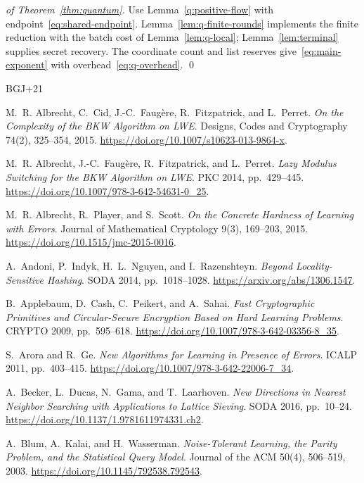 \documentclass[runningheads,envcountsame,envcountsect,orivec]{llncs}
\begin{document}
\begin{proof}[of Theorem~\ref{thm:quantum}]
Use Lemma~\ref{q:positive-flow} with endpoint~\eqref{eq:shared-endpoint}.
Lemma~\ref{lem:q-finite-rounds} implements the finite reduction with
the batch cost of Lemma~\ref{lem:q-local};
Lemma~\ref{lem:terminal} supplies secret recovery.
The coordinate count and list reserves give~\eqref{eq:main-exponent}
with overhead~\eqref{eq:q-overhead}.
\qed
\end{proof}


\label{page:main-end}
\FloatBarrier

\begin{thebibliography}{BGJ+21}
\label{sec:references}

M.~R. Albrecht, C.~Cid, J.-C.~Faug\`ere, R.~Fitzpatrick, and L.~Perret.
\emph{On the Complexity of the BKW Algorithm on LWE}.
Designs, Codes and Cryptography 74(2), 325--354, 2015.
\url{https://doi.org/10.1007/s10623-013-9864-x}.

M.~R. Albrecht, J.-C.~Faug\`ere, R.~Fitzpatrick, and L.~Perret.
\emph{Lazy Modulus Switching for the BKW Algorithm on LWE}.
PKC 2014, pp.~429--445.
\url{https://doi.org/10.1007/978-3-642-54631-0_25}.

M.~R. Albrecht, R.~Player, and S.~Scott.
\emph{On the Concrete Hardness of Learning with Errors}.
Journal of Mathematical Cryptology 9(3), 169--203, 2015.
\url{https://doi.org/10.1515/jmc-2015-0016}.

A.~Andoni, P.~Indyk, H.~L.~Nguyen, and I.~Razenshteyn.
\emph{Beyond Locality-Sensitive Hashing}.
SODA 2014, pp.~1018--1028.
\url{https://arxiv.org/abs/1306.1547}.

B.~Applebaum, D.~Cash, C.~Peikert, and A.~Sahai.
\emph{Fast Cryptographic Primitives and Circular-Secure Encryption Based on Hard Learning Problems}.
CRYPTO 2009, pp.~595--618.
\url{https://doi.org/10.1007/978-3-642-03356-8_35}.

S.~Arora and R.~Ge.
\emph{New Algorithms for Learning in Presence of Errors}.
ICALP 2011, pp.~403--415.
\url{https://doi.org/10.1007/978-3-642-22006-7_34}.

A.~Becker, L.~Ducas, N.~Gama, and T.~Laarhoven.
\emph{New Directions in Nearest Neighbor Searching with Applications to Lattice Sieving}.
SODA 2016, pp.~10--24.
\url{https://doi.org/10.1137/1.9781611974331.ch2}.

A.~Blum, A.~Kalai, and H.~Wasserman.
\emph{Noise-Tolerant Learning, the Parity Problem, and the Statistical Query Model}.
Journal of the ACM 50(4), 506--519, 2003.
\url{https://doi.org/10.1145/792538.792543}.


\end{thebibliography}
\end{document}
